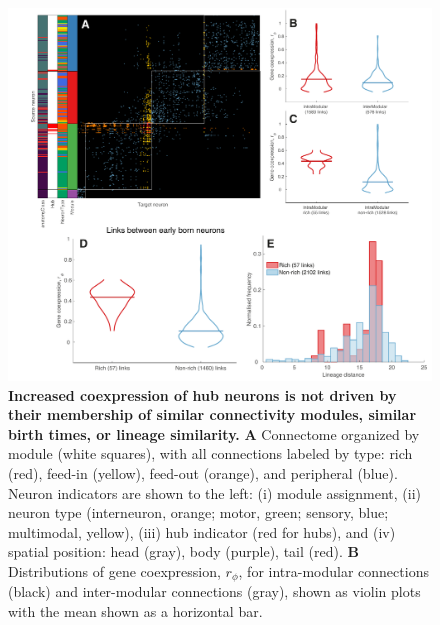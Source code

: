 \documentclass[10pt,letterpaper]{article}
\begin{document}
\begin{figure}[!h]
\centering
    \includegraphics[width=1\textwidth]{extras.pdf}
 \caption{
 \textbf{Increased coexpression of hub neurons is not driven by their membership of similar connectivity modules, similar birth times, or lineage similarity.}
\textbf{A} Connectome organized by module (white squares), with all connections labeled by type: rich (red), feed-in (yellow), feed-out (orange), and peripheral (blue).
Neuron indicators are shown to the left:
(i) module assignment,
(ii) neuron type (interneuron, orange; motor, green; sensory, blue; multimodal, yellow),
(iii) hub indicator (red for hubs), and
(iv) spatial position: head (gray), body (purple), tail (red).
\textbf{B} Distributions of gene coexpression, $r_\phi$, for intra-modular connections (black) and inter-modular connections (gray), shown as violin plots with the mean shown as a horizontal bar.
}
\end{figure}
\end{document}
